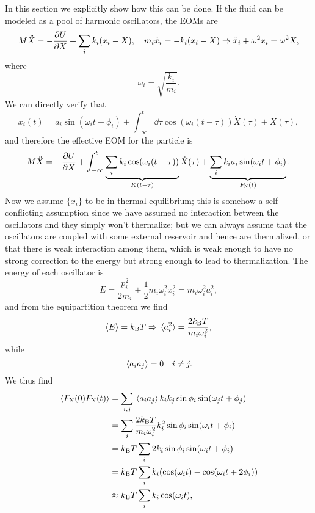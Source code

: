 \documentclass[hyperref, a4paper]{article}
\newcommand*{\kB}{k_{\text{B}}}
\newcommand{\fn}{F_{\text{N}}}
\begin{document}
In this section we explicitly show how this can be done.
If the fluid can be modeled as a pool of harmonic oscillators, 
the EOMs are 
\begin{equation}
    M \ddot{X} = - \pdv{U}{X} + \sum_{i} k_i (x_i - X), \quad 
    m_i \ddot{x}_i = - k_i (x_i - X) \Rightarrow 
    \ddot{x}_i + \omega^2 x_i = \omega^2 X ,
\end{equation}
where 
\begin{equation}
    \omega_i = \sqrt{\frac{k_i}{m_i}}.
\end{equation}
We can directly verify that 
\begin{equation}
    x_i(t) = a_i \sin(\omega_i t + \phi_i) 
    + \int_{-\infty}^{t} \dd{\tau} \cos(\omega_i (t - \tau)) \dot{X}(\tau)
    + X(\tau),
\end{equation}
and therefore the effective EOM for the particle is 
\begin{equation}
    M \ddot{X} = - \pdv{U}{X} + 
    \int_{-\infty}^{t} \underbrace{
        \sum_i k_i \cos(\omega_i (t - \tau))
    }_{K(t - \tau)} \dot{X}(\tau)
    + \underbrace{
        \sum_i k_i a_i \sin(\omega_i t + \phi_i)
    }_{\fn(t)} .
\end{equation}
Now we assume $\{x_i\}$ to be in thermal equilibrium;
this is somehow a self-conflicting assumption 
since we have assumed no interaction between the oscillators 
and they simply won't thermalize; 
but we can always assume that the oscillators are coupled 
with some external reservoir and hence are thermalized,
or that there is weak interaction among them,
which is weak enough to have no strong correction to the energy 
but strong enough to lead to thermalization.
The energy of each oscillator is 
\begin{equation}
    E = \frac{p_i^2}{2m_i} + \frac{1}{2} m_i \omega_i^2 x^2_i
    = m_i \omega_i^2 a_i^2,
\end{equation}
and from the equipartition theorem we find 
\begin{equation}
    \expval{E} = \kB T \Rightarrow \expval*{a_i^2} = \frac{2\kB T}{m_i \omega_i^2},
\end{equation}
while 
\begin{equation}
    \expval*{a_i a_j} = 0 \quad i \neq j.
\end{equation}
We thus find 
\begin{equation}
    \begin{aligned}
        \expval*{\fn(0) \fn(t)} &= 
        \sum_{i, j} \expval*{a_i a_j} k_i k_j \sin \phi_i \sin(\omega_j t + \phi_j) \\
        &= \sum_i \frac{2 \kB T}{m_i \omega_i^2} k_i^2 \sin \phi_i \sin (\omega_i t + \phi_i) \\
        &= \kB T \sum_{i} 2 k_i \sin \phi_i \sin(\omega_i t + \phi_i) \\
        &= \kB T \sum_i k_i (\cos(\omega_i t) - \cos(\omega_i t + 2 \phi_i)) \\
        &\approx \kB T \sum_i k_i \cos (\omega_i t),
    \end{aligned}
\end{equation}
\end{document}
